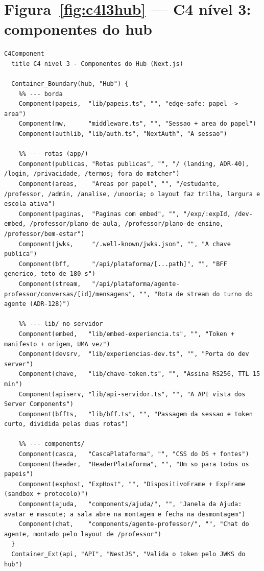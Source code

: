 \section{Figura~\ref{fig:c4l3hub} --- C4 nível 3: componentes do hub}

\begin{lstlisting}[language=mermaid]
C4Component
  title C4 nivel 3 - Componentes do Hub (Next.js)

  Container_Boundary(hub, "Hub") {
    %% --- borda
    Component(papeis,  "lib/papeis.ts", "", "edge-safe: papel -> area")
    Component(mw,      "middleware.ts", "", "Sessao + area do papel")
    Component(authlib, "lib/auth.ts", "NextAuth", "A sessao")

    %% --- rotas (app/)
    Component(publicas, "Rotas publicas", "", "/ (landing, ADR-40), /login, /privacidade, /termos; fora do matcher")
    Component(areas,    "Areas por papel", "", "/estudante, /professor, /admin, /analise, /unooria; o layout faz trilha, largura e escola ativa")
    Component(paginas,  "Paginas com embed", "", "/exp/:expId, /dev-embed, /professor/plano-de-aula, /professor/plano-de-ensino, /professor/bem-estar")
    Component(jwks,     "/.well-known/jwks.json", "", "A chave publica")
    Component(bff,      "/api/plataforma/[...path]", "", "BFF generico, teto de 180 s")
    Component(stream,   "/api/plataforma/agente-professor/conversas/[id]/mensagens", "", "Rota de stream do turno do agente (ADR-128)")

    %% --- lib/ no servidor
    Component(embed,   "lib/embed-experiencia.ts", "", "Token + manifesto + origem, UMA vez")
    Component(devsrv,  "lib/experiencias-dev.ts", "", "Porta do dev server")
    Component(chave,   "lib/chave-token.ts", "", "Assina RS256, TTL 15 min")
    Component(apiserv, "lib/api-servidor.ts", "", "A API vista dos Server Components")
    Component(bffts,   "lib/bff.ts", "", "Passagem da sessao e token curto, dividida pelas duas rotas")

    %% --- components/
    Component(casca,   "CascaPlataforma", "", "CSS do DS + fontes")
    Component(header,  "HeaderPlataforma", "", "Um so para todos os papeis")
    Component(exphost, "ExpHost", "", "DispositivoFrame + ExpFrame (sandbox + protocolo)")
    Component(ajuda,   "components/ajuda/", "", "Janela da Ajuda: avatar e mascote; a sala abre na montagem e fecha na desmontagem")
    Component(chat,    "components/agente-professor/", "", "Chat do agente, montado pelo layout de /professor")
  }
  Container_Ext(api, "API", "NestJS", "Valida o token pelo JWKS do hub")


\end{lstlisting}
